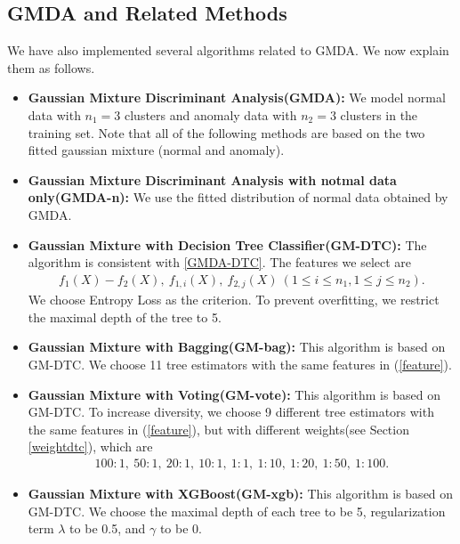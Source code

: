 \documentclass[english]{article}
\newenvironment{eqt}{\begin{equation}\begin{aligned}}{\end{aligned}\end{equation}}
\begin{document}
\subsection{GMDA and Related Methods}
\par We have also implemented several algorithms related to GMDA. We now explain them as follows.
\begin{itemize}
\item \textbf{Gaussian Mixture Discriminant Analysis(GMDA): } We model normal data with $n_1=3$ clusters and anomaly data with $n_2=3$ clusters in the training set. Note that all of the following methods are based on the two fitted gaussian mixture (normal and anomaly). 
\item \textbf{Gaussian Mixture Discriminant Analysis with notmal data only(GMDA-n): } We use the fitted distribution of normal data obtained by GMDA. 
\item \textbf{Gaussian Mixture with Decision Tree Classifier(GM-DTC): } The algorithm is consistent with \ref{GMDA-DTC}. The features we select are
\begin{eqt}
\label{feature}
f_1(X) - f_2(X), \ f_{1, i}(X), \ f_{2, j}(X)\ (1\leqslant i\leqslant n_1, 1\leqslant j\leqslant n_2).
\end{eqt}
We choose Entropy Loss as the criterion. To prevent overfitting, we restrict the maximal depth of the tree to 5. 
\item \textbf{Gaussian Mixture with Bagging(GM-bag): } This algorithm is based on GM-DTC. We choose 11 tree estimators with the same features in (\ref{feature}). 
\item \textbf{Gaussian Mixture with Voting(GM-vote): } This algorithm is based on GM-DTC. To increase diversity, we choose 9 different tree estimators with the same features in (\ref{feature}), but with different weights(see Section \ref{weightdtc}), which are
\begin{eqt}
100:1,\ 50:1,\ 20:1,\ 10:1,\ 1:1,\ 1:10,\ 1:20,\ 1:50,\ 1:100.
\end{eqt}
\item \textbf{Gaussian Mixture with XGBoost(GM-xgb): } This algorithm is based on GM-DTC. We choose the maximal depth of each tree to be 5, regularization term $\lambda$ to be 0.5, and $\gamma$ to be 0.

\end{itemize}
\end{document}
